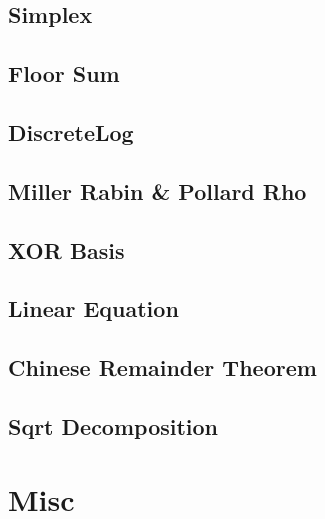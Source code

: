 \documentclass{article}
\begin{document}
\subsection{Simplex}


\subsection{Floor Sum}


\subsection{DiscreteLog}


\subsection{Miller Rabin \& Pollard Rho}


\subsection{XOR Basis}


\subsection{Linear Equation}


\subsection{Chinese Remainder Theorem}


\subsection{Sqrt Decomposition}


\section{Misc}

%
\end{document}
